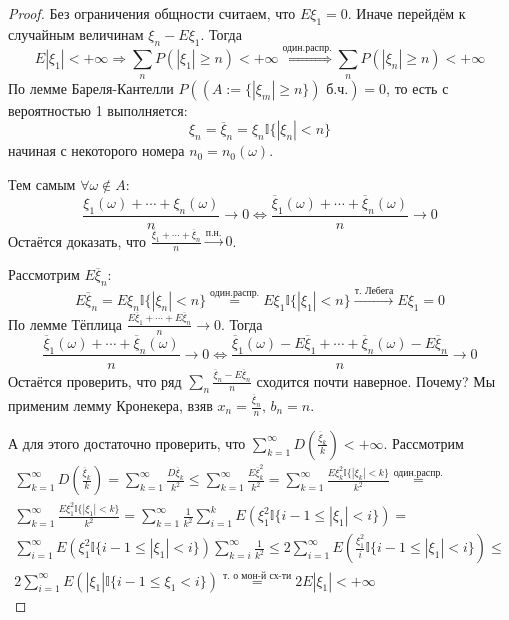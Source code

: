 \begin{proof}
	Без ограничения общности считаем, что $E\xi_1 = 0$. Иначе перейдём к случайным величинам $\xi_n - E\xi_1$. Тогда
	\[E|\xi_1| < +\infty \Rightarrow \sum_n P(|\xi_1| \geq n) < +\infty \stackrel{\text{один.распр.}}{\Leftrightarrow} \sum_n P(|\xi_n| \geq n) < +\infty\]
	По лемме Бареля-Кантелли $P((A:= \{|\xi_m| \geq n\}) \text{ б.ч.}) = 0$, то есть с вероятностью 1 выполняется:
	\[\xi_n = \overline{\xi}_n = \xi_n\mathbb{I}\{|\xi_n| < n\}\]
	начиная с некоторого номера $n_0 = n_0(\omega)$.

	Тем самым $\forall \omega \not\in A$:
	\[\frac{\xi_1(\omega) + \cdots + \xi_n(\omega)}{n} \to 0 \Leftrightarrow \frac{\overline{\xi}_1(\omega) + \cdots + \overline{\xi}_n(\omega)}{n} \to 0\]
	Остаётся доказать, что $\frac{\overline{\xi}_1 + \cdots + \overline{\xi}_n}{n} \stackrel{\text{п.н.}}{\to} 0$.

	Рассмотрим $E\overline{\xi}_n$:
	\[E\overline{\xi}_n = E\xi_n\mathbb{I}\{|\xi_n| < n\} \stackrel{\text{один.распр.}}{=} E\xi_1\mathbb{I}\{|\xi_1| < n\} \stackrel{\text{т. Лебега}}{\to} E\xi_1 = 0\]
	По лемме Тёплица $\frac{E\overline{\xi}_1 + \cdots + E\overline{\xi}_n}{n} \to 0$. Тогда
	\[\frac{\overline{\xi}_1(\omega) + \cdots + \overline{\xi}_n(\omega)}{n} \to 0 \Leftrightarrow \frac{\overline{\xi}_1(\omega) - E\overline{\xi}_1 + \cdots + \overline{\xi}_n(\omega) - E\overline{\xi}_n}{n} \to 0\]
	Остаётся проверить, что ряд $\sum_n \frac{\overline{\xi}_n - E\overline{\xi}_n}{n}$ сходится почти наверное. Почему? Мы применим лемму Кронекера, взяв $x_n = \frac{\overline{\xi}_n}{n},\, b_n = n$.

	А для этого достаточно проверить, что $\sum_{k = 1}^\infty D\left(\frac{\overline{\xi}_k}{k}\right) < +\infty$. Рассмотрим
	\begin{align*}
		\sum_{k = 1}^\infty D\left(\frac{\overline{\xi}_k}{k}\right) = \sum_{k = 1}^\infty \frac{D\overline{\xi}_k}{k^2} \leq \sum_{k = 1}^\infty \frac{E\overline{\xi}_k^2}{k^2} = \sum_{k = 1}^\infty \frac{E\xi_k^2\mathbb{I}\{|\xi_k| < k\}}{k^2} \stackrel{\text{один.распр.}}{=} \\
		\sum_{k = 1}^\infty \frac{E\xi_1^2\mathbb{I}\{|\xi_1| < k\}}{k^2} = \sum_{k = 1}^\infty \frac{1}{k^2}\sum_{i = 1}^k E\left(\xi_1^2\mathbb{I}\{i - 1 \leq |\xi_1| < i\}\right) =                                                                                                \\
		\sum_{i = 1}^\infty E\left(\xi_1^2\mathbb{I}\{i - 1 \leq |\xi_1| < i\}\right) \sum_{k = i}^\infty \frac{1}{k^2} \leq 2\sum_{i = 1}^\infty E\left(\frac{\xi_1^2}{i}\mathbb{I}\{i - 1 \leq |\xi_1| < i\}\right) \leq                                                             \\
		2 \sum_{i = 1}^\infty E(|\xi_1|\mathbb{I}\{i - 1 \leq \xi_1 < i\}) \stackrel{\text{т. о мон-й сх-ти}}{=} 2E|\xi_1| < +\infty
	\end{align*}
\end{proof}


